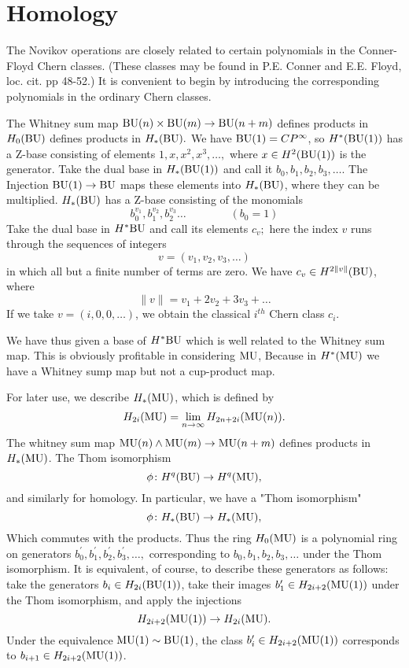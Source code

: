 \documentclass[../main]{subfiles}
\begin{document}
\label{sec:p1c3}

\chapter{Homology}
The Novikov operations are closely related to certain polynomials in the Conner-Floyd Chern classes. (These classes may be found in P.E. Conner and E.E. Floyd, loc. cit. pp 48-52.) It is convenient to begin by introducing the corresponding polynomials in the ordinary Chern classes.

The Whitney sum map $\mathop{\mathrm{BU}}(n) \times \mathop{\mathrm{BU}}(m) \to \mathop{\mathrm{BU}}(n+m)$ defines products in $H_{0}(\mathop{\mathrm{BU}})$ defines products in $H_{ \ast}(\mathop{\mathrm{BU}}).$ We have $\mathop{\mathrm{BU}}(1) = CP^{\infty}$, so $H^*(\mathop{\mathrm{BU}}(1))$ has a 
Z-base consisting of elements $1,x,x^{2},x^{3},\ldots,$ where $x \in H^{2}(\mathop{\mathrm{BU}}(1))$ is the generator. Take the dual base in $H_{\ast}(\mathop{\mathrm{BU}}(1))$ and call it $b_0,b_1,b_2,b_3,\ldots .$ The Injection $\mathop{\mathrm{BU}}(1) \to \mathop{\mathrm{BU}}$ maps these elements into $H_{\ast}(\mathop{\mathrm{BU}})$, where they can be multiplied. $H_{\ast}(\mathop{\mathrm{BU}})$ has a Z-base consisting of the monomials 
$$
b_0^{v_1},b_1^{v_2},b_2^{v_3}\ldots \qquad \qquad (b_0=1)
$$ 
Take the dual base in $H^*{\mathop{\mathrm{BU}}}$ and call its elements $c_{v};$ here the index $v$ runs through the sequences of integers 
$$
  v = (v_1,v_2,v_3,\ldots)
$$ 
in which all but a finite number of terms are zero. We have $c_{v}\in H^{2\|v\|}(\mathop{\mathrm{BU}})$, where 
$$
  \|v\| = v_1 + 2v_2+ 3v_3+ \ldots
$$ 
If we take $v = (i, 0, 0, \ldots)$, we obtain the classical $i^{th}$ Chern class $c_{i}$. 

We have thus given a base of $H^*{\mathop{\mathrm{BU}}}$ which is well related to the Whitney sum map. This is obviously profitable in considering $\mathop{\mathrm{MU}}$, Because in $H^*(\mathop{\mathrm{MU}})$ we have a Whitney sump map but not a cup-product map. 

For later use, we describe $H_{\ast}(\mathop{\mathrm{MU}})$, which is defined by 
$$
  H_{2i}(\mathop{\mathrm{MU}}) = \lim_{n \to \infty} H_{2n+2i}(\mathop{\mathrm{MU}}(n)) 
.$$ 
The whitney sum map $\mathop{\mathrm{MU}}(n) \wedge \mathop{\mathrm{MU}}(m) \to \mathop{\mathrm{MU}}(n+m)$ defines products in $H_{\ast}(\mathop{\mathrm{MU}})$. The Thom isomorphism 
$$
  \phi\colon  H^q(\mathop{\mathrm{BU}} ) \to  H^q(\mathop{\mathrm{MU}} ) 
,$$ 
and similarly for homology. In particular, we have a "Thom isomorphism"
$$
  \phi\colon  H_{\ast}(\mathop{\mathrm{BU}} )  \to  H_{\ast}(\mathop{\mathrm{MU}} ) , 
$$ 
Which commutes with the products. Thus the ring $H_{0}(\mathop{\mathrm{MU}}) $ is a polynomial ring on generators $b^{\prime}_0,b^{\prime}_1,b^{\prime}_2,b^{\prime}_3,\ldots ,$ corresponding to $b_0,b_1,b_2,b_3,\ldots $ under the Thom isomorphism. It is equivalent, of course, to describe these generators as follows: take the generators  $b_{i} \in H_{2i}(\mathop{\mathrm{BU}}(1) ) $, take their images $b^{\prime}_{1}\in H_{2i+2}(\mathop{\mathrm{MU}}(1))$ under the Thom isomorphism, and apply the injections
$$
  H_{2i+2}(\mathop{\mathrm{MU}}(1) ) \to H_{2i}(\mathop{\mathrm{MU}} )
.$$
Under the equivalence $\mathop{\mathrm{MU}}(1) \sim \mathop{\mathrm{BU}}(1)$, the class $b^{\prime}_{i} \in H_{2i+2}(\mathop{\mathrm{MU}}(1))$ corresponds to $b_{i+1} \in H_{2i+2}(\mathop{\mathrm{MU}}(1))$.
\end{document}
